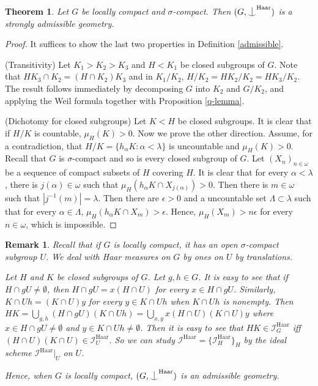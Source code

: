 \documentclass{article}
\newtheorem{theorem}[definition]{Theorem}
\newtheorem{remark}[definition]{Remark}
\newcommand{\I}{\mathcal{I}}
\newcommand{\HH}{\mathrm{Haar}}
\newcommand{\ind}{\mathrel{\raise0.2ex\hbox{\ooalign{\hidewidth$\vert$\hidewidth\cr\raise-0.9ex\hbox{$\smile$}}}}}
\begin{document}
\begin{theorem}
Let $G$ be locally compact and $\sigma$-compact. Then
$(G, \ind^\HH)$ is a strongly admissible geometry.
\end{theorem}
\begin{proof}
It suffices to show the last two properties in Definition \ref{admissible}.

(Transitivity) Let $K_1>K_2>K_3$ and $H<K_1$ be closed subgroups of $G$. Note that $HK_3\cap K_2=(H\cap K_2)K_3$ and in $K_1/K_2$, $H/K_2=HK_2/K_2=HK_3/K_2$. The result follows immediately by decomposing 
$G$ into $K_2$ and $G/K_2$, and applying the Weil formula together with Proposition \ref{q-lemma}.

(Dichotomy for closed subgroups)  Let $K<H$ be closed subgroups. It is clear that if $H/K$ is countable, $\mu_H(K)>0$. Now we prove the other direction. Assume, for a contradiction, that $H/K=\{h_\alpha K:\alpha<\lambda\}$ is uncountable and $\mu_H(K)>0$.
Recall that $G$ is $\sigma$-compact and so is every closed subgroup of $G$. Let $(X_n)_{n\in\omega}$ be a sequence of compact subsets of $H$ covering $H$. It is clear that for every $\alpha<\lambda$, there is $j(\alpha)\in\omega$ such that $\mu_H(h_\alpha K\cap X_{j(\alpha)})>0$. Then there is $m\in\omega$ such that $|j^{-1}(m)|=\lambda$. Then there are $\epsilon>0$ and a uncountable set $\Lambda\subset\lambda$ such that for every $\alpha\in \Lambda$, $\mu_H(h_\alpha K\cap X_m)>\epsilon$. Hence, $\mu_H(X_m)>n\epsilon$ for every $n\in\omega$, which is impossible.
\end{proof}

\begin{remark}
Recall that if $G$ is locally compact, it has an open $\sigma$-compact subgroup $U$. We deal with Haar measures on $G$ by ones on $U$ by translations. 

Let $H$ and $K$ be closed subgroups of $G$. Let $g,h\in G$. It is easy to see that if $H\cap gU\neq\emptyset$, then $H\cap gU=x(H\cap U)$ for every $x\in H\cap gU$. Similarly, $K\cap Uh=(K\cap U)y$ for every $y\in K\cap Uh$ when $K\cap Uh$ is nonempty. Then $HK=\bigcup_{g,h} (H\cap gU)(K\cap Uh)=\bigcup_{x,y}x(H\cap U)(K\cap U)y$ where $x\in H\cap gU\neq\emptyset$ and $y\in K\cap Uh\neq \emptyset$. Then it is easy to see that $HK\in \I^\HH_G$ iff $(H\cap U)(K\cap U)\in \I_U^\HH$. So we can study $\I^\HH=\{\I^\HH_H\}_H$ by the ideal scheme $\I^\HH|_U$ on $U$.

Hence, when $G$ is locally compact, $(G, \ind^\HH)$ is an admissible geometry.
\end{remark}
\end{document}
